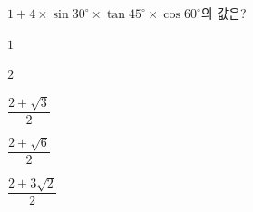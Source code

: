 $1+4\times\sin 30^\circ\times\tan 45^\circ\times\cos 60^\circ$의 값은?
\begin{choices32}{\rule[-3ex]{0pt}{8ex}$1$}{\rule[-3ex]{0pt}{8ex}$2$}{\rule[-3ex]{0pt}{8ex}$\dfrac{2+\sqrt{3}}{2}$}{\rule[-3ex]{0pt}{8ex}$\dfrac{2+\sqrt{6}}{2}$}{\rule[-3ex]{0pt}{8ex}$\dfrac{2+3\sqrt{2}}{2}$}\end{choices32}
